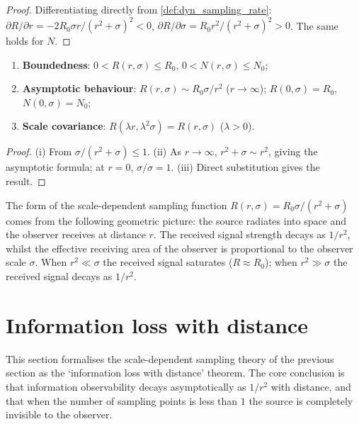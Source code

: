 \begin{proof}
Differentiating directly from \cref{def:dyn_sampling_rate}: $\partial R/\partial r=-2R_0\sigma r/(r^2+\sigma)^2<0$, $\partial R/\partial\sigma=R_0r^2/(r^2+\sigma)^2>0$. The same holds for $N$.
\end{proof}

\begin{property}\label{prop:dyn_sampling_properties}
\begin{enumerate}[label=(\roman*)]
    \item \textbf{Boundedness}: $0<R(r,\sigma)\le R_0$, $0<N(r,\sigma)\le N_0$;
    \item \textbf{Asymptotic behaviour}: $R(r,\sigma)\sim R_0\sigma/r^2$ ($r\to\infty$); $R(0,\sigma)=R_0$, $N(0,\sigma)=N_0$;
    \item \textbf{Scale covariance}: $R(\lambda r,\lambda^2\sigma)=R(r,\sigma)$ ($\lambda>0$).
\end{enumerate}
\end{property}

\begin{proof}
(i) From $\sigma/(r^2+\sigma)\le 1$. (ii) As $r\to\infty$, $r^2+\sigma\sim r^2$, giving the asymptotic formula; at $r=0$, $\sigma/\sigma=1$. (iii) Direct substitution gives the result.
\end{proof}

\begin{remark}\label{rem:dyn_sampling_physical_source}
The form of the scale-dependent sampling function $R(r,\sigma)=R_0\sigma/(r^2+\sigma)$ comes from the following geometric picture: the source radiates into space and the observer receives at distance $r$. The received signal strength decays as $1/r^2$, whilst the effective receiving area of the observer is proportional to the observer scale $\sigma$. When $r^2\ll\sigma$ the received signal saturates ($R\approx R_0$); when $r^2\gg\sigma$ the received signal decays as $1/r^2$.
\end{remark}

\section{Information loss with distance}
\label{sec:dyn_information_distance}

This section formalises the scale-dependent sampling theory of the previous section as the `information loss with distance' theorem. The core conclusion is that information observability decays asymptotically as $1/r^2$ with distance, and that when the number of sampling points is less than $1$ the source is completely invisible to the observer.

